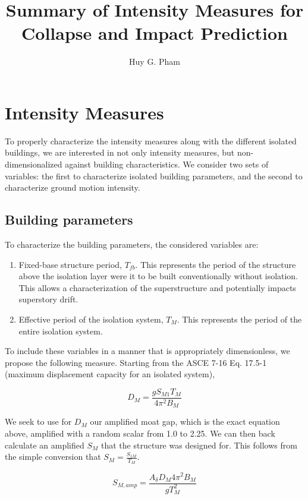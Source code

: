 \documentclass{article}
\begin{document}
\title{Summary of Intensity Measures for Collapse and Impact Prediction}
\author{Huy G. Pham}

\maketitle

\section{Intensity Measures}

To properly characterize the intensity measures along with the different isolated buildings, we are interested in not only intensity measures, but non-dimensionalized against building characteristics. We consider two sets of variables: the first to characterize isolated building parameters, and the second to characterize ground motion intensity.

\subsection{Building parameters}
To characterize the building parameters, the considered variables are:

	\begin{enumerate}
		\item Fixed-base structure period, $T_{fb}$. This represents the period of the structure above the isolation layer were it to be built conventionally without isolation. This allows a characterization of the superstructure and potentially impacts superstory drift.
		\item Effective period of the isolation system, $T_M$. This represents the period of the entire isolation system. 
	\end{enumerate}
	
To include these variables in a manner that is appropriately dimensionless, we propose the following measure. Starting from the ASCE 7-16 Eq. 17.5-1 (maximum displacement capacity for an isolated system),

	$$D_M = \frac{g S_{M1} T_M}{4 \pi^2 B_M}$$

We seek to use for $D_M$ our amplified moat gap, which is the exact equation above, amplified with a random scalar from 1.0 to 2.25. We can then back calculate an amplified $S_{M}$ that the structure was designed for. This follows from the simple conversion that $S_M = \frac{S_{1M}}{T_M}$.

	$$S_{M, amp} = \frac{A_\delta D_M 4 \pi^2 B_M}{g T_M^2}$$
	
\end{document}

